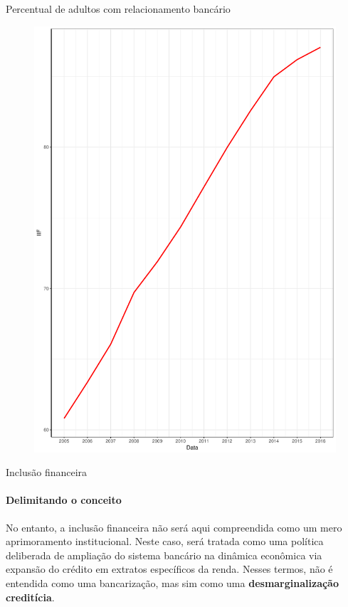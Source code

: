 \documentclass[pdf, xcolor=table]{beamer}
\begin{document}
\begin{frame}{Percentual de adultos com relacionamento bancário}
\begin{figure}
    \centering
    \label{plot1}
    \includegraphics[width=0.8\paperwidth,height=0.8\paperheight]{plot.pdf}
\end{figure}
\end{frame}


\begin{frame}{Inclusão financeira}
\framesubtitle{Delimitando o conceito}
No entanto, a inclusão financeira não será aqui compreendida como um mero aprimoramento  institucional. Neste caso, será tratada como uma política deliberada de ampliação do sistema bancário na dinâmica econômica via expansão do crédito em extratos específicos da renda. Nesses termos, não é entendida como uma bancarização, mas sim como uma \textbf{desmarginalização creditícia}.
\end{frame}
\end{document}
